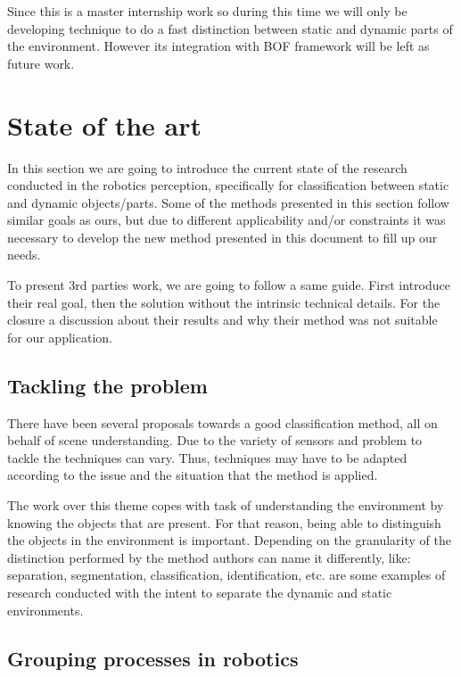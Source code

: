 Since this is a master internship work so during this time we will only be developing technique to do a fast distinction between static and dynamic parts of the environment. However its integration with BOF framework will be left as future work.

\section{State of the art}
In this section we are going to introduce the current state of the research conducted in the robotics perception, specifically for classification between static and dynamic objects/parts. Some of the methods presented in this section follow similar goals as ours, but due to different applicability and/or constraints it was necessary to develop the new method presented in this document to fill up our needs.

To present 3rd parties work, we are going to follow a same guide. First introduce their real goal, then the solution without the intrinsic technical details. For the closure a discussion about their results and why their method was not suitable for our application.

\subsection{Tackling the problem}

There have been several proposals towards a good classification method, all on behalf of scene understanding. Due to the variety of sensors and problem to tackle the techniques can vary. Thus, techniques may have to be adapted according to the issue and the situation that the method is applied.

The work over this theme copes with task of understanding the environment by knowing the objects that are present. For that reason, being able to distinguish the objects in the environment is important. Depending on the granularity of the distinction performed by the method authors can name it differently, like: separation, segmentation, classification, identification, etc. \cite{Wolf04onlinesimultaneous} \cite{DBLP:conf/iros/LidorisWB08} are some examples of research conducted with the intent to separate the dynamic and static environments.

\subsection{Grouping processes in robotics}

